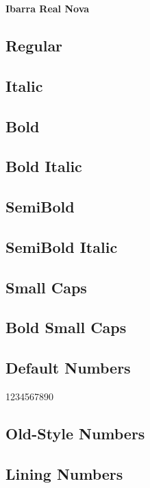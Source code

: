 \documentclass[12pt]{article}
\begin{document}
\begin{center}\Huge\bfseries
Ibarra Real Nova
\end{center}

\subsection*{Regular}
\lipsum[1]

\subsection*{Italic}
\textit{\lipsum[2]}

\subsection*{Bold}

\textbf{\lipsum[3]}

\subsection*{Bold Italic}

\textbf{\textit{\lipsum[4]}}


\subsection*{SemiBold}

{\ibarraSemiBold\lipsum[5]}

\subsection*{SemiBold Italic}

{\ibarraSemiBold\itshape\lipsum[6]}

\subsection*{Small Caps}
\textsc{\lipsum[7]}

\subsection*{Bold Small Caps}
\textsc{\textbf{\lipsum[8]}}

\subsection*{Default Numbers}

1234567890

\subsection*{Old-Style Numbers}


\subsection*{Lining Numbers}

\end{document}
